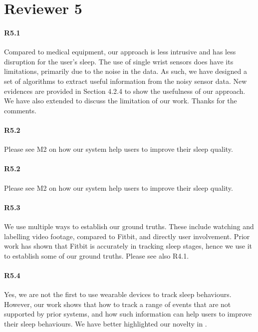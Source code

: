 \section*{Reviewer 5}

\paragraph{R5.1} Compared to medical equipment, our approach is less intrusive and has less disruption for the user’s sleep. The use of
single wrist sensors does have its limitations, primarily due to the noise in the data. As such, we have designed a set of algorithms to
extract useful information from the noisy sensor data. New evidences are provided in Section 4.2.4 to show the usefulness of our approach.
We have also extended  to discuss the limitation of our work. Thanks for the comments.

\paragraph{R5.2} Please see M2 on how our system help users to improve their sleep quality.

\paragraph{R5.2} Please see M2 on how our system help users to improve their sleep quality.

\paragraph{R5.3} We use multiple ways to establish our ground truths. These include watching and labelling video footage, compared to
Fitbit, and directly user involvement. Prior work has shown that Fitbit is accurately in tracking sleep stages, hence we use it to
establish some of our ground truths. Please see also R4.1.

\paragraph{R5.4} Yes, we are not the first to use wearable devices to track sleep behaviours. However, our work shows that how
 to track a range of events that are not supported by prior systems, and how such information can help users to improve
their sleep behaviours. We have better highlighted our novelty in .
